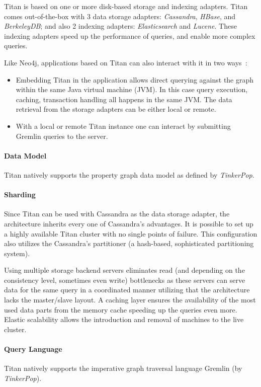 Titan is based on one or more disk-based storage and indexing adapters. Titan comes out-of-the-box with 3 data storage adapters: \emph{Cassandra}, \emph{HBase}, and \emph{BerkeleyDB}; and also 2 indexing adapters: \emph{Elasticsearch} and \emph{Lucene}. These indexing adapters speed up the performance of queries, and enable more complex queries.

Like Neo4j, applications based on Titan can also interact with it in two ways~\cite{titan-arch}:
\begin{itemize}[topsep=0pt]
  \item Embedding Titan in the application allows direct querying against the graph within the same Java virtual machine (JVM). In this case query execution, caching, transaction handling all happens in the same JVM. The data retrieval from the storage adapters can be either local or remote.
  \item With a local or remote Titan instance one can interact by submitting Gremlin queries to the server.
\end{itemize}


\paragraph{Data Model}
Titan natively supports the property graph data model as defined by \emph{TinkerPop}.

\paragraph{Sharding}
Since Titan can be used with Cassandra as the data storage adapter, the architecture inherits every one of Cassandra's advantages. It is possible to set up a highly available Titan cluster with no single points of failure. This configuration also utilizes the Cassandra's partitioner (a hash-based, sophisticated partitioning system).

Using multiple storage backend servers eliminates read (and depending on the consistency level, sometimes even write) bottlenecks as these servers can serve data for the same query in a coordinated manner utilizing that the architecture lacks the master/slave layout. A caching layer ensures the availability of the most used data parts from the memory cache speeding up the queries even more. Elastic scalability allows the introduction and removal of machines to the live cluster.


\paragraph{Query Language}
Titan natively supports the imperative graph traversal language Gremlin (by \emph{TinkerPop}).


